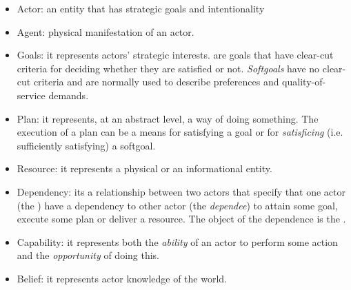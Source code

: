 \begin{itemize}
    \item Actor: an entity that has strategic goals and intentionality
    \item Agent: physical manifestation of an actor.
    \item Goals: it represents actors’ strategic interests.  are goals that have clear-cut criteria for deciding whether they are satisfied or not. \textit{Softgoals} have no clear-cut criteria and are normally used to describe preferences and quality-of-service demands.

    \item Plan: it represents, at an abstract level, a way of doing something. The execution of a plan can be a means for satisfying a goal or for \textit{satisficing} (i.e. sufficiently satisfying) a softgoal.

    \item Resource: it represents a physical or an informational entity.

    \item Dependency: its a relationship between two actors that specify that one actor (the ) have a dependency to other actor (the \textit{dependee}) to attain some goal, execute some plan or deliver a resource. The object of the dependence is the .

    \item Capability: it represents both the \textit{ability} of an actor to perform some action and the \textit{opportunity} of doing this.
    \item Belief: it represents actor knowledge of the world.


\end{itemize}

